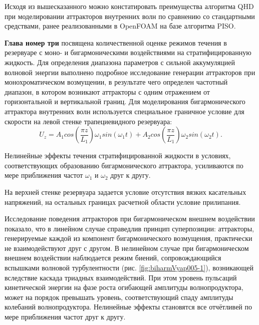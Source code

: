 \documentclass[utf8x]{G7-32} %
\begin{document}
Исходя из вышесказанного можно констатировать преимущества алгоритма QHD при моделировании аттракторов внутренних волн по сравнению со стандартными средствами, ранее реализованными в OpenFOAM на базе алгоритма PISO. 


\textbf{Глава номер три} посвящена количественной оценке режимов течения в резервуаре с моно- и бигармоническими воздействиями на стратифицированную жидкость. Для определения диапазона параметров с сильной аккумуляцией волновой энергии выполнено подробное исследование генерации аттракторов при монохроматическом возмущении, в результате чего определен частотный диапазон, в котором возникают аттракторы с одним отражением от горизонтальной и вертикальной границ. Для моделирования бигармонического аттрактора внутренних волн используется специальное граничное условие для скорости на левой стенке трапециевидного резервуара:
$$U_z = A_1 cos\left(\frac{\pi z}{L_1}\right) \omega_1   sin(\omega_1 t) + A_2 cos\left(\frac{\pi z}{L_1}\right) \omega_2  sin(\omega_2 t).$$

Нелинейные эффекты течения стратифицированной жидкости в условиях, соответствующих образованию бигармонического аттрактора, усиливаются по мере приближения частот $\omega_1$ и $\omega_2$ друг к другу. 

На верхней стенке резервуара задается условие отсутствия вязких касательных напряжений, на остальных границах расчетной области условие прилипания. 

Исследование поведения аттракторов при бигармоническом внешнем воздействии показало, что в линейном случае справедлив принцип суперпозиции: аттракторы, генерируемые каждой из компонент бигармонического возмущения, практически не взаимодействуют друг с другом. В нелинейном случае при бигармоническом внешнем воздействии наблюдается режим биений, сопровождающийся вспышками волновой турбулентности (рис. \ref{fig:biharmVyap005-1}), возникающей вследствие каскада триадных взаимодействий. При этом уровень пульсаций кинетической энергии на фазе роста огибающей амплитуды волнопродуктора, может на порядок превышать уровень, соответствующий спаду амплитуды колебаний волнопродуктора. Нелинейные эффекты становятся все отчётливей по мере приближения частот друг к другу. 
\end{document}
